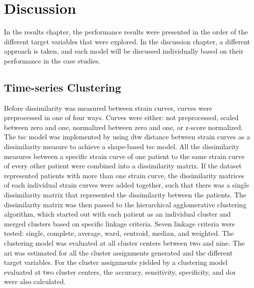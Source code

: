 \chapter{Discussion} \label{chap:discussion}

In the results chapter, the performance results were presented in the order of the different target variables that were explored. In the discussion chapter, a different approach is taken, and each model will be discussed individually based on their performance in the case studies.

\section{Time-series Clustering} \label{sec:disc_tsc}

Before dissimilarity was measured between strain curves, curves were preprocessed in one of four ways. 
Curves were either: not preprocessed, scaled between zero and one, normalized between zero and one, or z-score normalized. The \acrshort{tsc} model was implemented by using \acrshort{dtw} distance between strain curves as a dissimilarity measure to achieve a shape-based \acrshort{tsc} model. All the dissimilarity measures between a specific strain curve of one patient to the same strain curve of every other patient were combined into a dissimilarity matrix. If the dataset represented patients with more than one strain curve, the dissimilarity matrices of each individual strain curves were added together, such that there was a single dissimilarity matrix that represented the dissimilarity between the patients. The dissimilarity matrix was then passed to the hierarchical agglomerative clustering algorithm, which started out with each patient as an individual cluster and merged clusters based on specific linkage criteria. Seven linkage criteria were tested: single, complete, average, ward, centroid, median, and weighted. The clustering model was evaluated at all cluster centers between two and nine. The \acrshort{ari} was estimated for all the cluster assignments generated and the different target variables. For the cluster assignments yielded by a clustering model evaluated at two cluster centers, the accuracy, sensitivity, specificity, and \acrshort{dor} were also calculated. \bigskip

